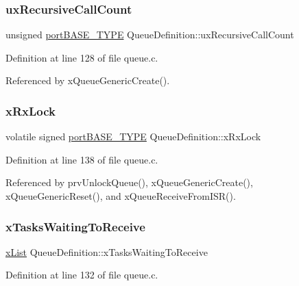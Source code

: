 \subsubsection{\texorpdfstring{ux\+Recursive\+Call\+Count}{uxRecursiveCallCount}}
{\footnotesize\ttfamily unsigned \hyperlink{portmacro_8h_a1ebe82d24d764ae4e352f7c3a9f92c01}{port\+B\+A\+S\+E\+\_\+\+T\+Y\+PE} Queue\+Definition\+::ux\+Recursive\+Call\+Count}



Definition at line 128 of file queue.\+c.



Referenced by x\+Queue\+Generic\+Create().

\mbox{\label{structQueueDefinition_a55d7241c91d75f3bf4ad4032aeaaf824}} 
\subsubsection{\texorpdfstring{x\+Rx\+Lock}{xRxLock}}
{\footnotesize\ttfamily volatile signed \hyperlink{portmacro_8h_a1ebe82d24d764ae4e352f7c3a9f92c01}{port\+B\+A\+S\+E\+\_\+\+T\+Y\+PE} Queue\+Definition\+::x\+Rx\+Lock}



Definition at line 138 of file queue.\+c.



Referenced by prv\+Unlock\+Queue(), x\+Queue\+Generic\+Create(), x\+Queue\+Generic\+Reset(), and x\+Queue\+Receive\+From\+I\+S\+R().

\mbox{\label{structQueueDefinition_a3f26a41f0c0d17fc4645905b309b33aa}} 
\subsubsection{\texorpdfstring{x\+Tasks\+Waiting\+To\+Receive}{xTasksWaitingToReceive}}
{\footnotesize\ttfamily \hyperlink{list_8h_a3cee7d8d40380f66ac73b8825b5a0fb0}{x\+List} Queue\+Definition\+::x\+Tasks\+Waiting\+To\+Receive}



Definition at line 132 of file queue.\+c.



